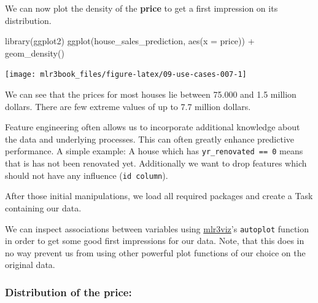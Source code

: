 \documentclass[
  11pt,
  parskip=half,
  DIV=calc,
  BCOR=10mm,
  x11names]{scrbook}
\newenvironment{Shaded}{}{}
\newcommand{\DataTypeTok}[1]{#1}
\newcommand{\KeywordTok}[1]{\textcolor[rgb]{0.00,0.00,1.00}{#1}}
\newcommand{\NormalTok}[1]{#1}
\newcommand{\OperatorTok}[1]{#1}
\newcommand{\StringTok}[1]{\textcolor[rgb]{0.00,0.50,0.50}{#1}}
\begin{document}
We can now plot the density of the \textbf{price} to get a first impression on its distribution.

\begin{Shaded}
\begin{Highlighting}[]
\KeywordTok{library}\NormalTok{(ggplot2)}
\KeywordTok{ggplot}\NormalTok{(house_sales_prediction, }\KeywordTok{aes}\NormalTok{(}\DataTypeTok{x =}\NormalTok{ price)) }\OperatorTok{+}\StringTok{ }\KeywordTok{geom_density}\NormalTok{()}
\end{Highlighting}
\end{Shaded}

\begin{center}\texttt{[image: mlr3book\_files/figure-latex/09-use-cases-007-1]} \end{center}

We can see that the prices for most houses lie between 75.000 and 1.5 million dollars.
There are few extreme values of up to 7.7 million dollars.

Feature engineering often allows us to incorporate additional knowledge about the data and underlying processes.
This can often greatly enhance predictive performance.
A simple example: A house which has \texttt{yr\_renovated\ ==\ 0} means that is has not been renovated yet.
Additionally we want to drop features which should not have any influence (\texttt{id\ column}).

After those initial manipulations, we load all required packages and create a Task containing our data.

\begin{Shaded}
\end{Shaded}

We can inspect associations between variables using \href{https://mlr3viz.mlr-org.com}{mlr3viz}'s \texttt{autoplot} function in order to get some good first impressions for our data.
Note, that this does in no way prevent us from using other powerful plot functions of our choice on the original data.

\hypertarget{distribution-of-the-price}{%
\subsubsection{Distribution of the price:}\label{distribution-of-the-price}}
\end{document}
